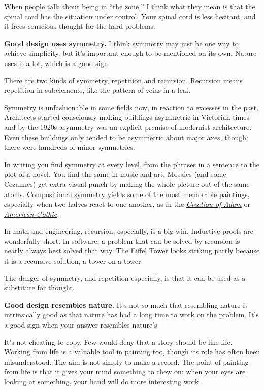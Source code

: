 When people talk about being in ``the zone,'' I think what they mean is
that the spinal cord has the situation under control. Your spinal cord
is less hesitant, and it frees conscious thought for the hard problems.

\textbf{Good design uses symmetry.} I think symmetry may just be one way
to achieve simplicity, but it's important enough to be mentioned on its
own. Nature uses it a lot, which is a good sign.

There are two kinds of symmetry, repetition and recursion. Recursion
means repetition in subelements, like the pattern of veins in a leaf.

Symmetry is unfashionable in some fields now, in reaction to excesses in
the past. Architects started consciously making buildings asymmetric in
Victorian times and by the 1920s asymmetry was an explicit premise of
modernist architecture. Even these buildings only tended to be
asymmetric about major axes, though; there were hundreds of minor
symmetries.

In writing you find symmetry at every level, from the phrases in a
sentence to the plot of a novel. You find the same in music and art.
Mosaics (and some Cezannes) get extra visual punch by making the whole
picture out of the same atoms. Compositional symmetry yields some of the
most memorable paintings, especially when two halves react to one
another, as in the \emph{\href{symptg.html}{Creation of Adam}} or
\emph{\href{symptg.html}{American Gothic}.}

In math and engineering, recursion, especially, is a big win. Inductive
proofs are wonderfully short. In software, a problem that can be solved
by recursion is nearly always best solved that way. The Eiffel Tower
looks striking partly because it is a recursive solution, a tower on a
tower.

The danger of symmetry, and repetition especially, is that it can be
used as a substitute for thought.

\textbf{Good design resembles nature.} It's not so much that resembling
nature is intrinsically good as that nature has had a long time to work
on the problem. It's a good sign when your answer resembles nature's.

It's not cheating to copy. Few would deny that a story should be like
life. Working from life is a valuable tool in painting too, though its
role has often been misunderstood. The aim is not simply to make a
record. The point of painting from life is that it gives your mind
something to chew on: when your eyes are looking at something, your hand
will do more interesting work.


